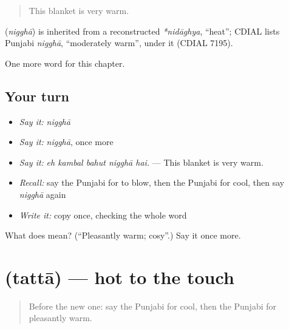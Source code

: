 \begin{quote}
This blanket is very warm.
\end{quote}

\begin{cousinweb}
\textbf{} (\emph{nigghā}) is inherited from a reconstructed \emph{*nidāghya}, \textquotedblleft{}heat\textquotedblright{}; CDIAL lists Punjabi \emph{nigghā}, \textquotedblleft{}moderately warm\textquotedblright{}, under it (CDIAL 7195).
\end{cousinweb}

\begin{grammarlens}[title={What you've built}]
One more word for this chapter.
\end{grammarlens}

\subsection*{Your turn}
\begin{itemize}
\raggedright
  \item \emph{Say it:} \emph{nigghā}
  \item \emph{Say it:} \emph{nigghā}, once more
  \item \emph{Say it:} \emph{eh kambal bahut nigghā hai.} — This blanket is very warm.
  \item \emph{Recall:} say the Punjabi for to blow, then the Punjabi for cool, then say \emph{nigghā} again
  \item \emph{Write it:} copy \textbf{} once, checking the whole word
\end{itemize}

\begin{tcolorbox}[breakable,colback=teal!4,colframe=teal!35!black,title={Before you move on}]
What does  mean? (\textquotedblleft{}Pleasantly warm; cosy\textquotedblright{}.) Say it once more.
\end{tcolorbox}
\section[\texorpdfstring{\pa{ਤੱਤਾ} (tattā)}{ਤੱਤਾ (tattā)}]{ (tattā) — hot to the touch}

\label{lesson:PA-C291-tatta}



\begin{quote}
Before the new one: say the Punjabi for cool, then the Punjabi for pleasantly warm.
\end{quote}

